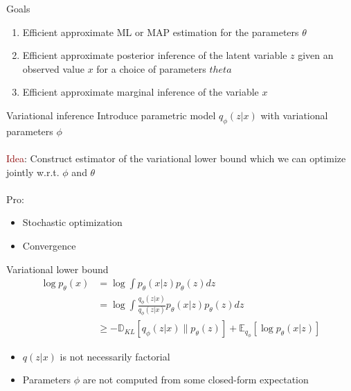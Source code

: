 \documentclass[unicode,11pt]{beamer}
\begin{document}
\begin{frame}[fragile]{Goals}
  \begin{enumerate}
    \item Efficient approximate ML or MAP estimation for the parameters $\theta$
    \item Efficient approximate posterior inference of the latent variable $z$ given an observed value $x$
for a choice of parameters $theta$
    \item Efficient approximate marginal inference of the variable $x$ 
  \end{enumerate}
\end{frame}

\begin{frame}[fragile]{Variational inference}
  Introduce parametric model $q_{\phi}(z|x)$ with variational parameters $\phi$\\
  ~\\
  \textcolor{darkred}{Idea}: Construct estimator of the variational lower bound which we can optimize jointly 
  w.r.t. $\phi$ and $\theta$\\
  ~\\
  Pro:
  \begin{itemize}
    \item Stochastic optimization
    \item Convergence
  \end{itemize}
  
\end{frame}

\begin{frame}[fragile]{Variational lower bound}
	\begin{align*} 
		\log {p_\theta (x)} &= \log \int {p_\theta (x|z) p_\theta(z) dz} \\
		&= \log \int{ \frac{q_\phi (z|x)}{q_\phi (z|x)} p_\theta (x|z) p_{\theta}(z) dz} \\
		&\ge -\mathbb{D}_{KL}[q_\phi (z|x) \parallel p_{\theta}(z)] + \mathbb{E}_{q_{\phi}} [\log p_\theta (x|z)]
	\end{align*} 

  \begin{itemize}
    \item $q(z|x)$ is not necessarily factorial
    \item Parameters $\phi$ are not computed from some closed-form expectation
  \end{itemize}


\end{frame}
\end{document}

